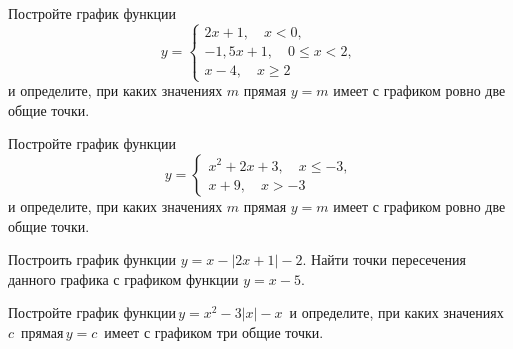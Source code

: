 \begin{class}[number=8]
	\begin{listofex}
		\item  Постройте график функции
		\[y=	 \left\{
		\begin{array}{l}
			2x+1, \quad x<0,\\
			-1,5x+1, \quad 0\leq x<2,\\
			x-4, \quad x\geq 2
		\end{array}
		\right. \]
		и определите, при каких значениях \( m \) прямая \( y=m \) имеет с графиком ровно две общие точки.
		\item Постройте график функции
		\[y=	 \left\{
		\begin{array}{l}
			x^2+2x+3, \quad x\leq-3,\\
			x+9, \quad x>-3
		\end{array}
		\right. \]
		и определите, при каких значениях \( m \) прямая \( y=m \) имеет с графиком ровно две общие точки.
		\item Построить график функции \( y=x-|2x+1|-2 \). Найти точки пересечения данного графика с графиком функции \( y=x-5 \).
		\item Постройте график функции \( y=x^2-3|x|-x \)  и определите, при каких значениях \( c \)  прямая \( y=c \)  имеет с графиком три общие точки.
	\end{listofex}
\end{class}

